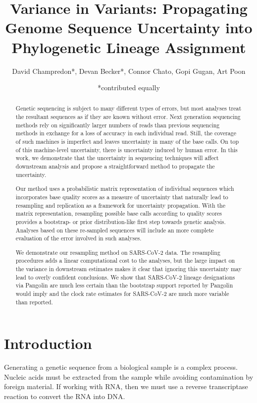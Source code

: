 \documentclass[10pt]{article}
\title{Variance in Variants: Propagating Genome Sequence Uncertainty
into Phylogenetic Lineage Assignment}
\author{David Champredon*, Devan Becker*, Connor Chato, Gopi Gugan, Art
Poon}
\date{*contributed equally}
\begin{document}
\maketitle

\normalsize
\vspace{1cm}
\tableofcontents

\begin{abstract}
Genetic sequencing is subject to many different types of errors, but most analyses treat the resultant sequences as if they are known without error. Next generation sequencing methods rely on significantly larger numbers of reads than previous sequencing methods in exchange for a loss of accuracy in each individual read. Still, the coverage of such machines is imperfect and leaves uncertainty in many of the base calls. On top of this machine-level uncertainty, there is uncertainty induced by human error. In this work, we demonstrate that the uncertainty in sequencing techniques will affect downstream analysis and propose a straightforward method to propagate the uncertainty.

Our method uses a probabilistic matrix representation of individual sequences which incorporates base quality scores as a measure of uncertainty that naturally lead to resampling and replication as a framework for uncertainty propagation. With the matrix representation, resampling possible base calls according to quality scores provides a bootstrap- or prior distribution-like first step towards genetic analysis. Analyses based on these re-sampled sequences will include an more complete evaluation of the error involved in such analyses.

We demonstrate our resampling method on SARS-CoV-2 data. The resampling procedures adds a linear computational cost to the analyses, but the large impact on the variance in downstream estimates makes it clear that ignoring this uncertainty may lead to overly confident conclusions. We show that SARS-CoV-2 lineage designations via Pangolin are much less certain than the bootstrap support reported by Pangolin would imply and the clock rate estimates for SARS-CoV-2 are much more variable than reported.
\end{abstract}


\section{Introduction}

Generating a genetic sequence from a biological sample is a complex process.
Nucleic acids must be extracted from the sample while avoiding contamination by foreign material.
If working with RNA, then we must use a reverse transcriptase reaction to convert the RNA into DNA.
\end{document}
